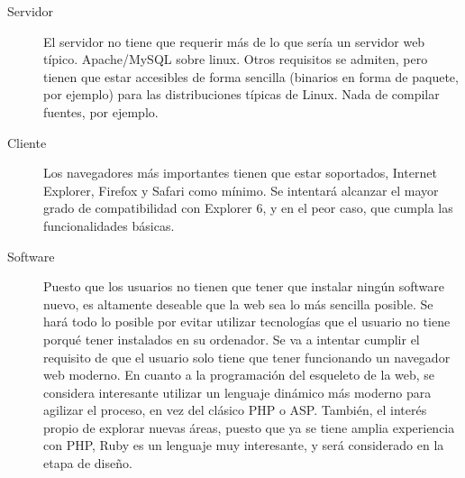 \begin{description}
	\item[Servidor] El servidor no tiene que requerir más de lo que sería un servidor web típico. Apache/MySQL sobre linux. Otros requisitos se admiten, pero tienen que estar accesibles de forma sencilla (binarios en forma de paquete, por ejemplo) para las distribuciones típicas de Linux. Nada de compilar fuentes, por ejemplo.
	\item[Cliente] Los navegadores más importantes tienen que estar soportados, Internet Explorer, Firefox y Safari como mínimo. Se intentará alcanzar el mayor grado de compatibilidad con Explorer 6, y en el peor caso, que cumpla las funcionalidades básicas.
	\item[Software] Puesto que los usuarios no tienen que tener que instalar ningún software nuevo, es altamente deseable que la web sea lo más sencilla posible. Se hará todo lo posible por evitar utilizar tecnologías que el usuario no tiene porqué tener instalados en su ordenador. Se va a intentar cumplir el requisito de que el usuario solo tiene que tener funcionando un navegador web moderno. En cuanto a la programación del esqueleto de la web, se considera interesante utilizar un lenguaje dinámico más moderno para agilizar el proceso, en vez del clásico PHP o ASP. También, el interés propio de explorar nuevas áreas, puesto que ya se tiene amplia experiencia con PHP, Ruby es un lenguaje muy interesante, y será considerado en la etapa de diseño.
\end{description}
